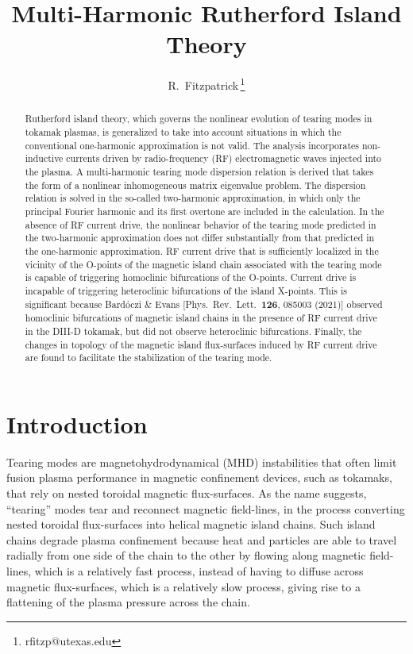 \documentclass[12pt,prb,aps]{revtex4-1}
\begin{document}
\title{Multi-Harmonic Rutherford Island Theory}

\author{R.~Fitzpatrick\,\footnote{rfitzp@utexas.edu}}

\begin{abstract}
Rutherford island theory, which governs the nonlinear evolution of tearing modes in tokamak plasmas,  is generalized to take into account situations in which the conventional one-harmonic
approximation is not valid. The analysis incorporates  non-inductive currents driven by radio-frequency (RF) electromagnetic waves injected into the plasma. A
multi-harmonic tearing mode dispersion relation is derived that takes the form of a nonlinear inhomogeneous matrix
eigenvalue problem.   The  dispersion relation is solved in the so-called two-harmonic approximation,
in which  only the principal Fourier harmonic and its first overtone are included in the calculation.
In the absence of RF current drive, the nonlinear behavior of the tearing
mode predicted in the two-harmonic approximation does not differ substantially from that predicted in the
 one-harmonic approximation.  RF current drive that is sufficiently localized in the
vicinity of the O-points of the magnetic island chain associated with the tearing mode is capable of triggering  homoclinic bifurcations of the O-points. Current
drive is incapable of triggering heteroclinic bifurcations of the island X-points. This is significant because
 Bard\'{o}czi \& Evans [Phys.\ Rev.\ Lett.\ {\bf 126}, 085003 (2021)]  observed homoclinic bifurcations of magnetic island chains in the presence of RF
 current drive in the DIII-D tokamak, but did not observe heteroclinic bifurcations. Finally, the changes in topology of the magnetic island
 flux-surfaces induced by RF current drive are found to facilitate the stabilization of the tearing mode. 
\end{abstract}

\maketitle

\section{Introduction}
Tearing modes are magnetohydrodynamical  (MHD) instabilities that often limit fusion plasma performance in  magnetic confinement devices, such as tokamaks, that rely on nested toroidal
magnetic flux-surfaces.\cite{fkr,wesson} As the name suggests, ``tearing''
modes tear and reconnect magnetic field-lines, in the process
converting nested toroidal flux-surfaces into helical magnetic
island chains.\cite{ruth} Such island chains degrade plasma confinement because
heat and particles are able to travel radially from one side of
the chain to the other by flowing along magnetic field-lines,
which is a relatively fast process, instead of having to diffuse
across magnetic flux-surfaces, which is a relatively slow
process, giving rise to a flattening of the plasma pressure across the  chain.\cite{chang,fitz}
\end{document}
